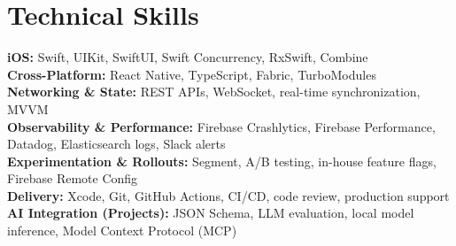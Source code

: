 \section{Technical Skills}
\textbf{iOS:} Swift, UIKit, SwiftUI, Swift Concurrency, RxSwift, Combine\\
\textbf{Cross-Platform:} React Native, TypeScript, Fabric, TurboModules\\
\textbf{Networking \& State:} REST APIs, WebSocket, real-time synchronization, MVVM\\
\textbf{Observability \& Performance:} Firebase Crashlytics, Firebase Performance, Datadog, Elasticsearch logs, Slack alerts\\
\textbf{Experimentation \& Rollouts:} Segment, A/B testing, in-house feature flags, Firebase Remote Config\\
\textbf{Delivery:} Xcode, Git, GitHub Actions, CI/CD, code review, production support\\
\textbf{AI Integration (Projects):} JSON Schema, LLM evaluation, local model inference, Model Context Protocol (MCP)
